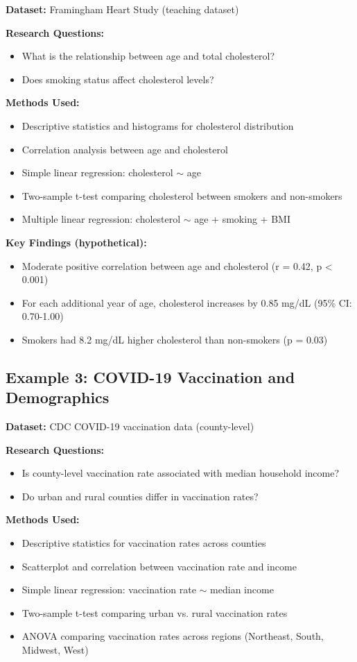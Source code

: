 \documentclass[11pt]{article}
\begin{document}
\textbf{Dataset:} Framingham Heart Study (teaching dataset)

\textbf{Research Questions:}
\begin{itemize}
\item What is the relationship between age and total cholesterol?
\item Does smoking status affect cholesterol levels?
\end{itemize}

\textbf{Methods Used:}
\begin{itemize}
\item Descriptive statistics and histograms for cholesterol distribution
\item Correlation analysis between age and cholesterol
\item Simple linear regression: cholesterol $\sim$ age
\item Two-sample t-test comparing cholesterol between smokers and non-smokers
\item Multiple linear regression: cholesterol $\sim$ age + smoking + BMI
\end{itemize}

\textbf{Key Findings (hypothetical):}
\begin{itemize}
\item Moderate positive correlation between age and cholesterol (r = 0.42, p < 0.001)
\item For each additional year of age, cholesterol increases by 0.85 mg/dL (95\% CI: 0.70-1.00)
\item Smokers had 8.2 mg/dL higher cholesterol than non-smokers (p = 0.03)
\end{itemize}

\subsection{Example 3: COVID-19 Vaccination and Demographics}

\textbf{Dataset:} CDC COVID-19 vaccination data (county-level)

\textbf{Research Questions:}
\begin{itemize}
\item Is county-level vaccination rate associated with median household income?
\item Do urban and rural counties differ in vaccination rates?
\end{itemize}

\textbf{Methods Used:}
\begin{itemize}
\item Descriptive statistics for vaccination rates across counties
\item Scatterplot and correlation between vaccination rate and income
\item Simple linear regression: vaccination rate $\sim$ median income
\item Two-sample t-test comparing urban vs. rural vaccination rates
\item ANOVA comparing vaccination rates across regions (Northeast, South, Midwest, West)
\end{itemize}
\end{document}
